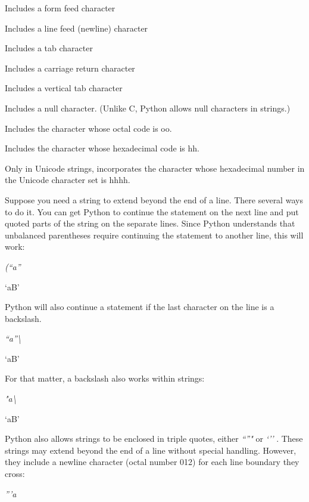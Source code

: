 Includes a form feed character



Includes a line feed (newline)
character



Includes a tab character



Includes a carriage return
character



Includes a vertical tab character



Includes a null character. (Unlike
C, Python allows null characters in strings.)



Includes the character whose octal
code is oo.



Includes the character whose
hexadecimal code is hh.



Only in Unicode strings,
incorporates the character whose hexadecimal number in the Unicode
character set is hhhh.

Suppose you need a string to extend
beyond the end of a line. There several ways to do it. You can get
Python to continue the statement on the next line and put quoted parts
of the string on the separate lines. Since Python understands that
unbalanced parentheses require continuing the statement to another line,
this will work:


\emph{(``a''}



`aB'

Python will also continue a
statement if the last character on the line is a backslash.


\emph{``a''\textbackslash{}}



`aB'

For that matter, a backslash also
works within strings:


\emph{"a\textbackslash{}}



`aB'

Python also allows strings to be
enclosed in triple quotes, either \emph{``''"} or \emph{`''} . These
strings may extend beyond the end of a line without special handling.
However, they include a newline character (octal number 012) for each
line boundary they cross:


\emph{'''a}



